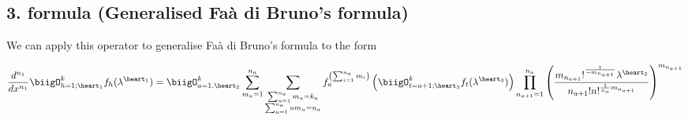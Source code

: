 \subsection{3. formula (Generalised Faà di Bruno's formula)}

We can apply this operator to generalise
Faà di Bruno's formula to the form

\begin{align}
        \frac{d^{n_1}}{dx^{n_1}}\biigO_{h=1; \heart_1}^k
        f_h(\lambda^{\heart_1}) = \biigO_{a=1, \heart_2}^k
        \sum_{m_a=1}^{n_a}\sum_{\substack{\sum_{u=1}^{n_a}
        m_u=k_a \\ \sum_{u=1}^{n_a}um_u=n_a}} f_a^{\left(
        \sum_{i=1}^{n_a} m_i\right)}\left(\biigO_{t=a+1; 
        \heart_3 }^k f_t(\lambda^{\heart_3 })\right)
        \prod_{n_{a+1}=1}^{n_a}\left(\frac{m_{n_{a+1
        }}!^{\frac{1}{-m_{n_{a+1}}}}\lambda^{\heart_2
        }}{n_{a+1}!n!^{\frac{1}{n_a}m_{n_{a+1}}}}\right
        )^{m_{n_{a+1}}}
\end{align}

